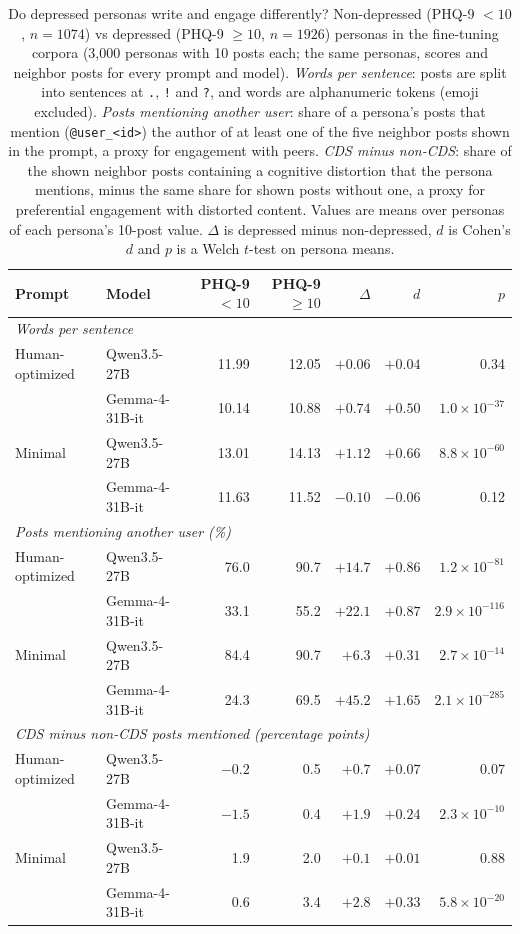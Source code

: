 \begin{table}[ht]
\centering
\small
\caption{Do depressed personas write and engage differently? Non-depressed (PHQ-9 $<10$, $n=1074$) vs depressed (PHQ-9 $\geq10$, $n=1926$) personas in the fine-tuning corpora (3,000 personas with 10 posts each; the same personas, scores and neighbor posts for every prompt and model). \emph{Words per sentence}: posts are split into sentences at \texttt{.}, \texttt{!} and \texttt{?}, and words are alphanumeric tokens (emoji excluded). \emph{Posts mentioning another user}: share of a persona's posts that mention (\texttt{@user\_<id>}) the author of at least one of the five neighbor posts shown in the prompt, a proxy for engagement with peers. \emph{CDS minus non-CDS}: share of the shown neighbor posts containing a cognitive distortion that the persona mentions, minus the same share for shown posts without one, a proxy for preferential engagement with distorted content. Values are means over personas of each persona's 10-post value. $\Delta$ is depressed minus non-depressed, $d$ is Cohen's $d$ and $p$ is a Welch $t$-test on persona means.}
\label{tab:sentence_length_depressed}
\begin{tabular}{llrrrrr}
\hline
Prompt & Model & PHQ-9 $<10$ & PHQ-9 $\geq10$ & $\Delta$ & $d$ & $p$ \\
\hline
\multicolumn{7}{l}{\textit{Words per sentence}} \\
Human-optimized & Qwen3.5-27B & 11.99 & 12.05 & $+0.06$ & $+0.04$ & 0.34 \\
 & Gemma-4-31B-it & 10.14 & 10.88 & $+0.74$ & $+0.50$ & $1.0\times10^{-37}$ \\
Minimal & Qwen3.5-27B & 13.01 & 14.13 & $+1.12$ & $+0.66$ & $8.8\times10^{-60}$ \\
 & Gemma-4-31B-it & 11.63 & 11.52 & $-0.10$ & $-0.06$ & 0.12 \\
\hline
\multicolumn{7}{l}{\textit{Posts mentioning another user (\%)}} \\
Human-optimized & Qwen3.5-27B & 76.0 & 90.7 & $+14.7$ & $+0.86$ & $1.2\times10^{-81}$ \\
 & Gemma-4-31B-it & 33.1 & 55.2 & $+22.1$ & $+0.87$ & $2.9\times10^{-116}$ \\
Minimal & Qwen3.5-27B & 84.4 & 90.7 & $+6.3$ & $+0.31$ & $2.7\times10^{-14}$ \\
 & Gemma-4-31B-it & 24.3 & 69.5 & $+45.2$ & $+1.65$ & $2.1\times10^{-285}$ \\
\hline
\multicolumn{7}{l}{\textit{CDS minus non-CDS posts mentioned (percentage points)}} \\
Human-optimized & Qwen3.5-27B & $-0.2$ & 0.5 & $+0.7$ & $+0.07$ & 0.07 \\
 & Gemma-4-31B-it & $-1.5$ & 0.4 & $+1.9$ & $+0.24$ & $2.3\times10^{-10}$ \\
Minimal & Qwen3.5-27B & 1.9 & 2.0 & $+0.1$ & $+0.01$ & 0.88 \\
 & Gemma-4-31B-it & 0.6 & 3.4 & $+2.8$ & $+0.33$ & $5.8\times10^{-20}$ \\
\hline
\end{tabular}
\end{table}
